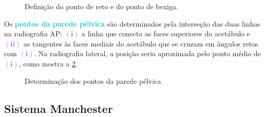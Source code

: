 \documentclass[11pt,a4paper]{article}
\begin{document}
	\begin{figure}[h]
		\centering
		\caption{Definição do ponto de reto e do ponto de bexiga.}
		\label{fig:icru38RetoEBexiga}
	\end{figure}


	Os \textcolor{DarkTurquoise}{\textbf{pontos da parede pélvica}} são determinados pela interseção das duas linhas na radiografia AP: \textcolor{MediumOrchid}{$\mathbf{(i)}$} a linha que conecta as faces superiores do acetábulo e \textcolor{MediumOrchid}{$\mathbf{(ii)}$} as tangentes às faces mediais do acetábulo que se cruzam em ângulos retos com \textcolor{MediumOrchid}{$\mathbf{(i)}$}. Na radiografia lateral, a posição seria aproximada pelo ponto médio de \textcolor{MediumOrchid}{$\mathbf{(i)}$}, como mostra a \ref{fig:icru38paredePelvica}.

	\begin{figure}[h]
		\centering
		\caption{Determinação dos pontos da parede pélvica}
		\label{fig:icru38paredePelvica}
	\end{figure}

\subsection*{Sistema Manchester}
\end{document}
